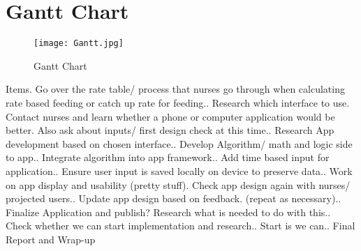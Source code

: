 \documentclass[fullpage,10pt, onecolumn, draftclsnofoot]{IEEEtran}
\begin{document}
\section{Gantt Chart}
\begin{figure}[h!]
\centering
\texttt{[image: Gantt.jpg]}
\centering
\caption{Gantt Chart}
\label{fig:gantt_chartl}
\end{figure}
Items. Go over the rate table/ process that nurses go through when calculating rate based feeding or catch up rate for feeding.. Research which interface to use. Contact nurses and learn whether a phone or computer application would be better. Also ask about inputs/ first design check at this time.. Research App development based on chosen interface.. Develop Algorithm/ math and logic side to app.. Integrate algorithm into app framework.. Add time based input for application.. Ensure user input is saved locally on device to preserve data.. Work on app display and usability (pretty stuff). Check app design again with nurses/ projected users.. Update app design based on feedback. (repeat as necessary).. Finalize Application and publish? Research what is needed to do with this.. Check whether we can start implementation and research.. Start is we can.. Final Report and Wrap-up\newline
\end{document}
